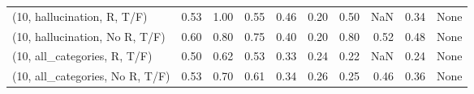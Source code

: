 \begin{table*}[h!]
\begin{adjustbox}{width=2\columnwidth,center}
\begin{tabular}{lrrr|rrr|rrr}
(10, hallucination, R, T/F)           &                      0.53 &                  1.00 &                      0.55 &                          0.46 &                      0.20 &                          0.50 &                                    NaN &                               0.34 &                                  None \\
(10, hallucination, No R, T/F)        &                      0.60 &                  0.80 &                      0.75 &                          0.40 &                      0.20 &                          0.80 &                                   0.52 &                               0.48 &                                  None \\
(10, all\_categories, R, T/F)          &                      0.50 &                  0.62 &                      0.53 &                          0.33 &                      0.24 &                          0.22 &                                    NaN &                               0.24 &                                  None \\
(10, all\_categories, No R, T/F)       &                      0.53 &                  0.70 &                      0.61 &                          0.34 &                      0.26 &                          0.25 &                                   0.46 &                               0.36 &                                  None \\




\end{tabular}
\end{adjustbox}
\end{table*}
